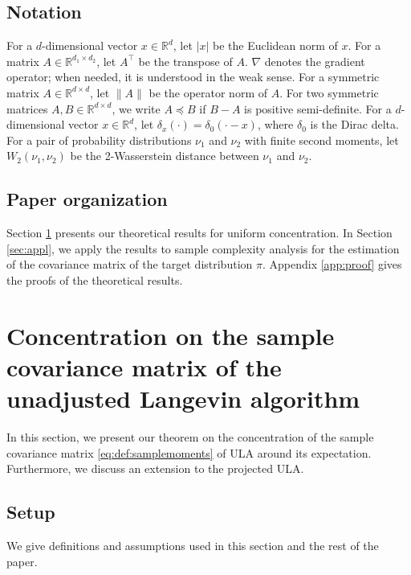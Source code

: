 \documentclass[12pt,reqno]{amsart}
\theoremstyle{remark}
\theoremstyle{definition}
\newcommand{\R}{\mathbb{R}}
\begin{document}
\subsection{Notation}\label{sec:intro:notation}
For a $d$-dimensional vector $x\in\R^{d}$, let $|x|$ be the Euclidean norm of $x$.
For a matrix $A\in\R^{d_{1}\times d_{2}}$, let $A^{\top}$ be the transpose of $A$.
$\nabla$ denotes the gradient operator; when needed, it is understood in the weak sense.
For a symmetric matrix $A\in\R^{d\times d}$, let $\|A\|$ be the operator norm of $A$.
For two symmetric matrices $A,B\in\R^{d\times d}$, we write $A\preceq B$ if $B-A$ is positive semi-definite.
For a $d$-dimensional vector $x\in\R^{d}$, let $\delta_{x}(\cdot)=\delta_{0}(\cdot-x)$, where $\delta_{0}$ is the Dirac delta.
For a pair of probability distributions $\nu_{1}$ and $\nu_{2}$ with finite second moments, let $W_{2}(\nu_{1},\nu_{2})$ be the 2-Wasserstein distance between $\nu_{1}$ and $\nu_{2}$.

\subsection{Paper organization}\label{sec:intro:organization}
Section \ref{sec:concentration} presents our theoretical results for uniform concentration.
In Section \ref{sec:appl}, we apply the results to sample complexity analysis for the estimation of the covariance matrix of the target distribution $\pi$.
Appendix \ref{app:proof} gives the proofs of the theoretical results.

\section{Concentration on the sample covariance matrix of the unadjusted Langevin algorithm}\label{sec:concentration}
In this section, we present our theorem on the concentration of the sample covariance matrix \eqref{eq:def:samplemoments} of ULA around its expectation.
Furthermore, we discuss an extension to the projected ULA.

\subsection{Setup}\label{sec:concentration:setup}
We give definitions and assumptions used in this section and the rest of the paper.
\end{document}
